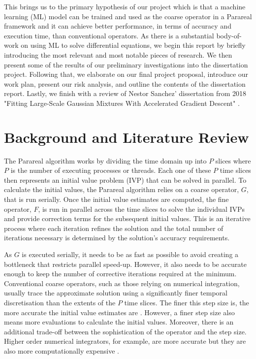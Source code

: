 \documentclass{article}
\begin{document}
This brings us to the primary hypothesis of our project which is that a machine learning (ML) model can be trained and used as the coarse operator in a Parareal framework and it can achieve better performance, in terms of accuracy and execution time, than conventional operators. As there is a substantial body-of-work on using ML to solve differential equations, we begin this report by briefly introducing the most relevant and most notable pieces of research. We then present some of the results of our preliminary investigations into the dissertation project. Following that, we elaborate on our final project proposal, introduce our work plan, present our risk analysis, and outline the contents of the dissertation report. Lastly, we finish with a review of Nestor Sanchez' dissertation from 2018 "Fitting Large-Scale Gaussian Mixtures With Accelerated Gradient Descent" \cite{sanchez2018}.

\section{Background and Literature Review}

The Parareal algorithm works by dividing the time domain up into $P$ slices where $P$ is the number of executing processes or threads. Each one of these $P$ time slices then represents an initial value problem (IVP) that can be solved in parallel. To calculate the initial values, the Parareal algorithm relies on a coarse operator, $G$, that is run serially. Once the initial value estimates are computed, the fine operator, $F$, is run in parallel across the time slices to solve the individual IVPs and provide correction terms for the subsequent initial values. This is an iterative process where each iteration refines the solution and the total number of iterations necessary is determined by the solution's accuracy requirements.

As $G$ is executed serially, it needs to be as fast as possible to avoid creating a bottleneck that restricts parallel speed-up. However, it also needs to be accurate enough to keep the number of corrective iterations required at the minimum. Conventional coarse operators, such as those relying on numerical integration, usually trace the approximate solution using a significantly finer temporal discretisation than the extents of the $P$ time slices. The finer this step size is, the more accurate the initial value estimates are \cite[p.~319-320]{suli2003}. However, a finer step size also means more evaluations to calculate the initial values. Moreover, there is an additional trade-off between the sophistication of the operator and the step size. Higher order numerical integrators, for example, are more accurate but they are also more computationally expensive \cite[p.~325]{suli2003}.
\end{document}

